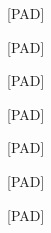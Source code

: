 \documentclass[varwidth=150mm]{standalone}
\begin{document}
\begin{CJK*}{UTF8}{gbsn}
{{{\colorbox{red!0.0}{\strut [PAD]} \colorbox{red!0.0}{\strut [PAD]} \colorbox{red!0.0}{\strut [PAD]} \colorbox{red!0.0}{\strut [PAD]} \colorbox{red!0.0}{\strut [PAD]} \colorbox{red!0.0}{\strut [PAD]} \colorbox{red!0.0}{\strut [PAD]}
}}}
\end{CJK*}
\end{document}
